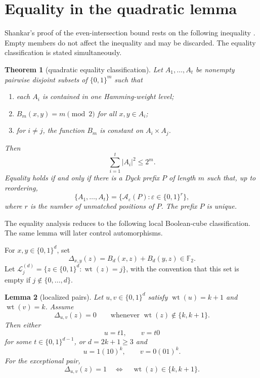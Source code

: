 \documentclass[11pt]{article}
\newtheorem{theorem}{Theorem}[section]
\newtheorem{lemma}[theorem]{Lemma}
\theoremstyle{definition}
\newcommand{\F}{\mathbb F}
\newcommand{\wt}{\operatorname{wt}}
\newcommand{\A}{\mathcal A}
\newcommand{\cL}{\mathcal L}
\newcommand{\bits}{\{0,1\}}
\newcommand{\eps}{\varepsilon}
\begin{document}
\section{Equality in the quadratic lemma}\label{sec:equality}

Shankar's proof of the even-intersection bound rests on the following inequality \cite[Lemma~2.3]{Shankar}.  Empty members do not affect the inequality and may be discarded.  The equality classification is stated simultaneously.

\begin{theorem}[quadratic equality classification]\label{thm:quadratic}
Let $A_1,\ldots,A_t$ be nonempty pairwise disjoint subsets of $\bits^m$ such that
\begin{enumerate}[label=(\roman*)]
 \item each $A_i$ is contained in one Hamming-weight level;
 \item $B_m(x,y)=m\pmod2$ for all $x,y\in A_i$;
 \item for $i\ne j$, the function $B_m$ is constant on $A_i\times A_j$.
\end{enumerate}
Then
\begin{equation}\label{eq:quadratic}
 \sum_{i=1}^t |A_i|^2\le2^m.
\end{equation}
Equality holds if and only if there is a Dyck prefix $P$ of length $m$ such that, up to reordering,
\[
 \{A_1,\ldots,A_t\}
 =\{\A_{\eps}(P):\eps\in\bits^r\},
\]
where $r$ is the number of unmatched positions of $P$.  The prefix $P$ is unique.
\end{theorem}

The equality analysis reduces to the following local Boolean-cube classification.  The same lemma will later control automorphisms.

For $x,y\in\bits^d$, set
\[
 \Delta_{x,y}(z)=B_d(x,z)+B_d(y,z)\in\F_2.
\]
Let $\cL_j^{(d)}=\{z\in\bits^d:\wt(z)=j\}$, with the convention that this set is empty if $j\notin\{0,\ldots,d\}$.

\begin{lemma}[localized pairs]\label{lem:localized}
Let $u,v\in\bits^d$ satisfy $\wt(u)=k+1$ and $\wt(v)=k$.  Assume
\begin{equation}\label{eq:localized}
 \Delta_{u,v}(z)=0
 \qquad\text{whenever }\wt(z)\notin\{k,k+1\}.
\end{equation}
Then either
\begin{equation}\label{eq:canonicalpair}
 u=t1,\qquad v=t0
\end{equation}
for some $t\in\bits^{d-1}$, or $d=2k+1\ge3$ and
\begin{equation}\label{eq:exceptionalpair}
 u=1(10)^k,\qquad v=0(01)^k.
\end{equation}
For the exceptional pair,
\begin{equation}\label{eq:exceptionalprofile}
 \Delta_{u,v}(z)=1
 \quad\Longleftrightarrow\quad
 \wt(z)\in\{k,k+1\}.
\end{equation}
\end{lemma}
\end{document}
